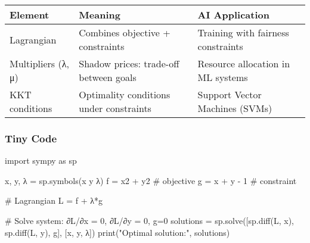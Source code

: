 \documentclass[
  letterpaper,
  DIV=11,
  numbers=noendperiod]{scrreprt}
\newenvironment{Shaded}{\begin{snugshade}}{\end{snugshade}}
\newcommand{\BuiltInTok}[1]{\textcolor[rgb]{0.00,0.23,0.31}{#1}}
\newcommand{\CommentTok}[1]{\textcolor[rgb]{0.37,0.37,0.37}{#1}}
\newcommand{\DecValTok}[1]{\textcolor[rgb]{0.68,0.00,0.00}{#1}}
\newcommand{\ImportTok}[1]{\textcolor[rgb]{0.00,0.46,0.62}{#1}}
\newcommand{\NormalTok}[1]{\textcolor[rgb]{0.00,0.23,0.31}{#1}}
\newcommand{\OperatorTok}[1]{\textcolor[rgb]{0.37,0.37,0.37}{#1}}
\newcommand{\StringTok}[1]{\textcolor[rgb]{0.13,0.47,0.30}{#1}}
\begin{document}
\begin{longtable}[]{@{}
  >{\raggedright\arraybackslash}p{}
  >{\raggedright\arraybackslash}p{}
  >{\raggedright\arraybackslash}p{}@{}}
\toprule\noalign{}
\begin{minipage}[b]{\linewidth}\raggedright
Element
\end{minipage} & \begin{minipage}[b]{\linewidth}\raggedright
Meaning
\end{minipage} & \begin{minipage}[b]{\linewidth}\raggedright
AI Application
\end{minipage} \\
\midrule\noalign{}
\endhead
\bottomrule\noalign{}
\endlastfoot
Lagrangian & Combines objective + constraints & Training with fairness
constraints \\
Multipliers (λ, μ) & Shadow prices: trade-off between goals & Resource
allocation in ML systems \\
KKT conditions & Optimality conditions under constraints & Support
Vector Machines (SVMs) \\
\end{longtable}

\subsubsection{Tiny Code}\label{tiny-code-143}

\begin{Shaded}
\begin{Highlighting}[]
\ImportTok{import}\NormalTok{ sympy }\ImportTok{as}\NormalTok{ sp}

\NormalTok{x, y, λ }\OperatorTok{=}\NormalTok{ sp.symbols(}\StringTok{\textquotesingle{}x y λ\textquotesingle{}}\NormalTok{)}
\NormalTok{f }\OperatorTok{=}\NormalTok{ x2 }\OperatorTok{+}\NormalTok{ y2  }\CommentTok{\# objective}
\NormalTok{g }\OperatorTok{=}\NormalTok{ x }\OperatorTok{+}\NormalTok{ y }\OperatorTok{{-}} \DecValTok{1}    \CommentTok{\# constraint}

\CommentTok{\# Lagrangian}
\NormalTok{L }\OperatorTok{=}\NormalTok{ f }\OperatorTok{+}\NormalTok{ λ}\OperatorTok{*}\NormalTok{g}

\CommentTok{\# Solve system: ∂L/∂x = 0, ∂L/∂y = 0, g=0}
\NormalTok{solutions }\OperatorTok{=}\NormalTok{ sp.solve([sp.diff(L, x), sp.diff(L, y), g], [x, y, λ])}
\BuiltInTok{print}\NormalTok{(}\StringTok{"Optimal solution:"}\NormalTok{, solutions)}
\end{Highlighting}
\end{Shaded}
\end{document}
